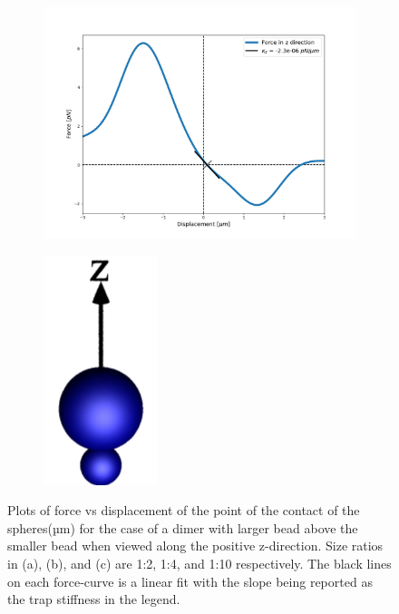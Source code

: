 \documentclass[preprint,  3p]{elsarticle}
\begin{document}
\begin{figure}
\medskip %
\begin{subfigure}{.475\linewidth}
	\includegraphics[width=\linewidth]{Images/lam=10_theta=0.png}
	\caption{}
	\label{lam=10}
\end{subfigure}\hfill %
\begin{subfigure}{.3\linewidth}
	\includegraphics[width=0.45\linewidth, keepaspectratio]{Images/theta=0.png}
	\label{large over small}
\end{subfigure}
\caption{Plots of force vs displacement of the point of the contact of the spheres(µm) for the case of a dimer with larger bead above the smaller bead when viewed along the positive z-direction. Size ratios in (a), (b), and (c) are 1:2, 1:4, and 1:10 respectively. The black lines on each force-curve is a linear fit with the slope being reported as the trap stiffness in the legend.}
\end{figure}
\end{document}
